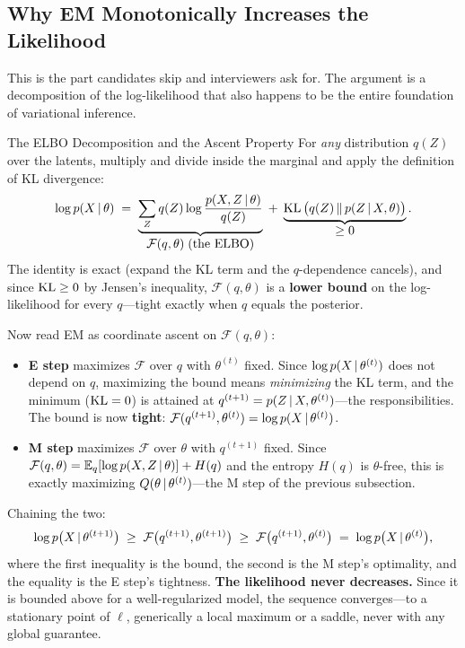 \subsection{Why EM Monotonically Increases the Likelihood}

This is the part candidates skip and interviewers ask for. The argument is a decomposition of the log-likelihood that also happens to be the entire foundation of variational inference.

\begin{mathresult}{The ELBO Decomposition and the Ascent Property}
For \emph{any} distribution $q(Z)$ over the latents, multiply and divide inside the marginal and apply the definition of KL divergence:
\begin{equation}
\log p(X \,|\, \theta) \;=\; \underbrace{\sum_Z q(Z) \log \frac{p(X, Z \,|\, \theta)}{q(Z)}}_{\textstyle \mathcal{F}(q, \theta) \;\text{(the ELBO)}} \;+\; \underbrace{\operatorname{KL}\big(q(Z) \,\|\, p(Z \,|\, X, \theta)\big)}_{\textstyle \ge 0}.
\label{eq:cml:elbo}
\end{equation}
The identity is exact (expand the KL term and the $q$-dependence cancels), and since $\operatorname{KL} \ge 0$ by Jensen's inequality, $\mathcal{F}(q,\theta)$ is a \textbf{lower bound} on the log-likelihood for every $q$---tight exactly when $q$ equals the posterior.

Now read EM as coordinate ascent on $\mathcal{F}(q, \theta)$:
\begin{itemize}
    \item \textbf{E step} maximizes $\mathcal{F}$ over $q$ with $\theta^{(t)}$ fixed. Since $\log p(X\,|\,\theta^{(t)})$ does not depend on $q$, maximizing the bound means \emph{minimizing} the KL term, and the minimum ($\operatorname{KL} = 0$) is attained at $q^{(t+1)} = p(Z \,|\, X, \theta^{(t)})$---the responsibilities. The bound is now \textbf{tight}: $\mathcal{F}(q^{(t+1)}, \theta^{(t)}) = \log p(X \,|\, \theta^{(t)})$.
    \item \textbf{M step} maximizes $\mathcal{F}$ over $\theta$ with $q^{(t+1)}$ fixed. Since $\mathcal{F}(q,\theta) = \operatorname{\mathbb{E}}_q[\log p(X,Z\,|\,\theta)] + H(q)$ and the entropy $H(q)$ is $\theta$-free, this is exactly maximizing $Q(\theta \,|\, \theta^{(t)})$---the M step of the previous subsection.
\end{itemize}
Chaining the two:
\begin{equation}
\log p\big(X \,|\, \theta^{(t+1)}\big) \;\ge\; \mathcal{F}\big(q^{(t+1)}, \theta^{(t+1)}\big) \;\ge\; \mathcal{F}\big(q^{(t+1)}, \theta^{(t)}\big) \;=\; \log p\big(X \,|\, \theta^{(t)}\big),
\end{equation}
where the first inequality is the bound, the second is the M step's optimality, and the equality is the E step's tightness. \textbf{The likelihood never decreases.} Since it is bounded above for a well-regularized model, the sequence converges---to a stationary point of $\ell$, generically a local maximum or a saddle, never with any global guarantee.
\end{mathresult}

